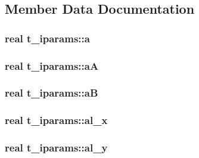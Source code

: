 \subsection{\-Member \-Data \-Documentation}
\hypertarget{uniont__iparams_a070fd67041cc597a6c1ec5efeee18969}{
\subsubsection[{a}]{\setlength{\rightskip}{0pt plus 5cm}real {\bf t\-\_\-iparams\-::a}}}\label{uniont__iparams_a070fd67041cc597a6c1ec5efeee18969}
\hypertarget{uniont__iparams_a3fe9cc5faaa995f6dc9e3ecb171cde5c}{
\subsubsection[{a\-A}]{\setlength{\rightskip}{0pt plus 5cm}real {\bf t\-\_\-iparams\-::a\-A}}}\label{uniont__iparams_a3fe9cc5faaa995f6dc9e3ecb171cde5c}
\hypertarget{uniont__iparams_ad81a551a8c0c84cb54663e7c6052bf59}{
\subsubsection[{a\-B}]{\setlength{\rightskip}{0pt plus 5cm}real {\bf t\-\_\-iparams\-::a\-B}}}\label{uniont__iparams_ad81a551a8c0c84cb54663e7c6052bf59}
\hypertarget{uniont__iparams_a566ef51c174fb6c3b0872654947bdde1}{
\subsubsection[{al\-\_\-x}]{\setlength{\rightskip}{0pt plus 5cm}real {\bf t\-\_\-iparams\-::al\-\_\-x}}}\label{uniont__iparams_a566ef51c174fb6c3b0872654947bdde1}
\hypertarget{uniont__iparams_aefc952edd1a976509d356fdfae8bf06a}{
\subsubsection[{al\-\_\-y}]{\setlength{\rightskip}{0pt plus 5cm}real {\bf t\-\_\-iparams\-::al\-\_\-y}}}\label{uniont__iparams_aefc952edd1a976509d356fdfae8bf06a}
